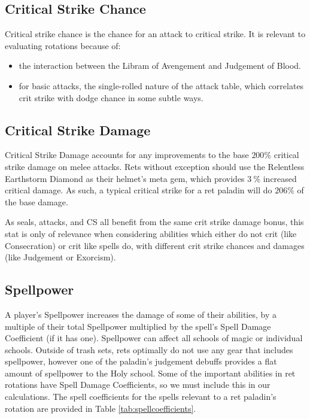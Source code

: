 \documentclass[letterpaper,11pt]{article}
\begin{document}
	\subsection{Critical Strike Chance}
	Critical strike chance is the chance for an attack to critical strike.
	It is relevant to evaluating rotations because of:
	\begin{itemize}
		\item the interaction between the Libram of Avengement and Judgement of Blood.
		\item for basic attacks, the single-rolled nature of the attack table, which correlates crit strike with dodge chance in some subtle ways.
	\end{itemize}
		
	\subsection{Critical Strike Damage}
	Critical Strike Damage accounts for any improvements to the base $200\%$ critical strike damage on melee attacks.
	Rets without exception should use the Relentless Earthstorm Diamond as their helmet's meta gem, which provides $3~\%$ increased critical damage.
	As such, a typical critical strike for a ret paladin will do $206\%$ of the base damage.
	
	As seals, attacks, and CS all benefit from the same crit strike damage bonus, this stat is only of relevance when considering abilities which either do not crit (like Consecration) or crit like spells do, with different crit strike chances and damages (like Judgement or Exorcism).
	
	\subsection{Spellpower}
	A player's Spellpower increases the damage of some of their abilities, by a multiple of their total Spellpower multiplied by the spell's Spell Damage Coefficient (if it has one).
	Spellpower can affect all schools of magic or individual schools.
	Outside of trash sets, rets optimally do not use any gear that includes spellpower, however one of the paladin's judgement debuffs provides a flat amount of spellpower to the Holy school.
	Some of the important abilities in ret rotations have Spell Damage Coefficients, so we must include this in our calculations.
	The spell coefficients for the spells relevant to a ret paladin's rotation are provided in Table \ref{tab:spellcoefficients}.
	
\end{document}
